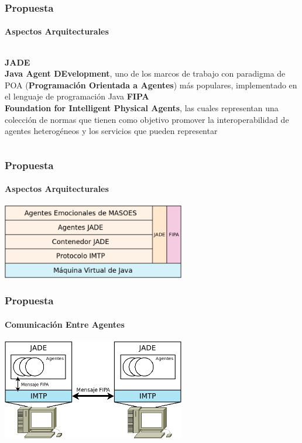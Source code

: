 \documentclass{beamer}
\begin{document}
\begin{frame}
\frametitle{Propuesta}
\framesubtitle{Aspectos Arquitecturales}
\begin{columns}
\textbf{JADE}\\
\textbf{Java Agent
DEvelopment}, uno de los marcos de trabajo con paradigma de POA (\textbf{Programación Orientada a Agentes})
más populares, implementado en el lenguaje de programación Java
\textbf{FIPA}\\
\textbf{Foundation for Intelligent Physical Agents},
las cuales representan una colección de normas que tienen como objetivo promover la interoperabilidad
de agentes heterogéneos y los servicios que pueden representar
\end{columns}
\end{frame}

\begin{frame}
\frametitle{Propuesta}
\framesubtitle{Aspectos Arquitecturales}
\centering
\includegraphics[width=8cm]{ilustraciones/arquitectura}
\end{frame}

\begin{frame}
\frametitle{Propuesta}
\framesubtitle{Comunicación Entre Agentes}
\centering
\includegraphics[width=8cm]{ilustraciones/comunicacion-entre-hosts}
\end{frame}
\end{document}
